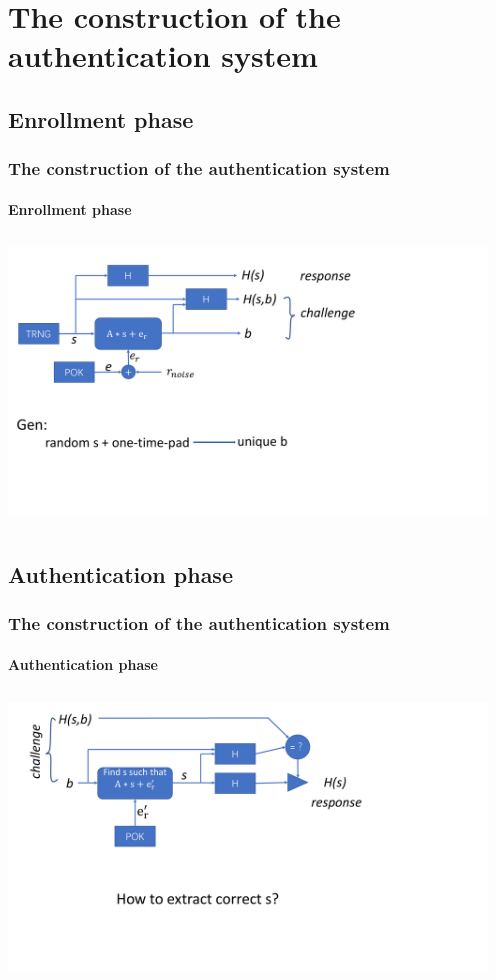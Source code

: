 \documentclass{beamer}
\begin{document}
\section{The construction of the authentication system}
\begin{outlineframe}
	\tableofcontents[currentsection]
\end{outlineframe}


\subsection{Enrollment phase}
\begin{frame}
    \frametitle{The construction of the authentication system}
    \framesubtitle{Enrollment phase}
    \includegraphics[width=5in,height=3in]{Enrollment-phase.pdf}
\end{frame}


\subsection{Authentication phase}
\begin{frame}
	\frametitle{The construction of the authentication system}
	\framesubtitle{Authentication phase}
	\vspace{0.5cm}
	\centering
	\includegraphics[width=5in,height=3in]{Authentication-phase.pdf}\\
\end{frame}
\end{document}
